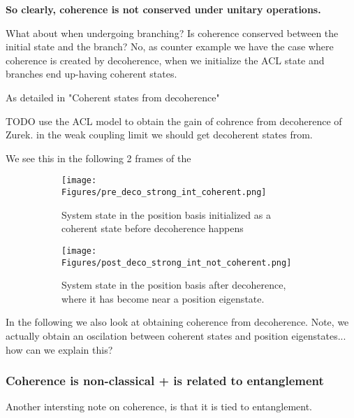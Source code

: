\documentclass{article}
\begin{document}
\textbf{So clearly, coherence is not conserved under unitary operations.}

What about when undergoing branching? Is coherence conserved between the initial state and the branch? 
No, as counter example we have the case where coherence is created by decoherence, when we initialize the ACL state and branches end up-having coherent states. 

As detailed in "Coherent states from decoherence"

TODO use the ACL model to obtain the gain of cohrence from decoherence of Zurek. in the weak coupling limit we should get decoherent states from.

We see this in the following 2 frames of the 
\begin{figure}[h!]
  \centering
  \begin{subfigure}[b]{0.49\linewidth}
    \texttt{[image: Figures/pre\_deco\_strong\_int\_coherent.png]}
    \label{fig:1}
    \caption{System state in the position basis initialized as a coherent state before decoherence happens} 
  \end{subfigure}
  \begin{subfigure}[b]{0.49\linewidth}
    \texttt{[image: Figures/post\_deco\_strong\_int\_not\_coherent.png]}
    \label{fig:2}
    \caption{System state in the position basis after decoherence, where it has become near a position eigenstate.}
  \end{subfigure}
  \label{fig:dist_EI_dep}
  \caption{}
\end{figure}
In the following we also look at obtaining coherence from decoherence. Note, we actually obtain an oscilation between coherent states and position eigenstates... how can we explain this?

\subsubsection{Coherence is non-classical + is related to entanglement}
Another intersting note on coherence, is that it is tied to entanglement. 
\end{document}
